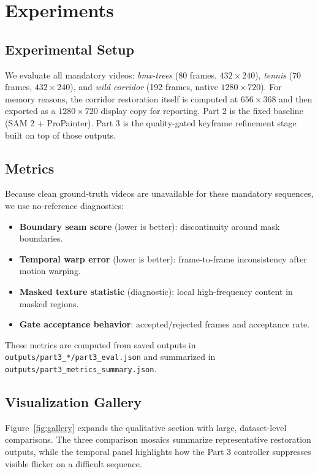 \documentclass[10pt,twocolumn,letterpaper]{article}
\begin{document}
\section{Experiments}
\subsection{Experimental Setup}
We evaluate all mandatory videos: \textit{bmx-trees} (80 frames, $432\times240$), \textit{tennis} (70 frames, $432\times240$), and \textit{wild corridor} (192 frames, native $1280\times720$). For memory reasons, the corridor restoration itself is computed at $656\times368$ and then exported as a $1280\times720$ display copy for reporting. Part 2 is the fixed baseline (SAM 2 + ProPainter). Part 3 is the quality-gated keyframe refinement stage built on top of those outputs.

\subsection{Metrics}
Because clean ground-truth videos are unavailable for these mandatory sequences, we use no-reference diagnostics:
\begin{itemize}
    \item \textbf{Boundary seam score} (lower is better): discontinuity around mask boundaries.
    \item \textbf{Temporal warp error} (lower is better): frame-to-frame inconsistency after motion warping.
    \item \textbf{Masked texture statistic} (diagnostic): local high-frequency content in masked regions.
    \item \textbf{Gate acceptance behavior}: accepted/rejected frames and acceptance rate.
\end{itemize}
These metrics are computed from saved outputs in \texttt{outputs/part3\_*/part3\_eval.json} and summarized in \texttt{outputs/part3\_metrics\_summary.json}.

\subsection{Visualization Gallery}
Figure~\ref{fig:gallery} expands the qualitative section with large, dataset-level comparisons. The three comparison mosaics summarize representative restoration outputs, while the temporal panel highlights how the Part 3 controller suppresses visible flicker on a difficult sequence.
\end{document}
